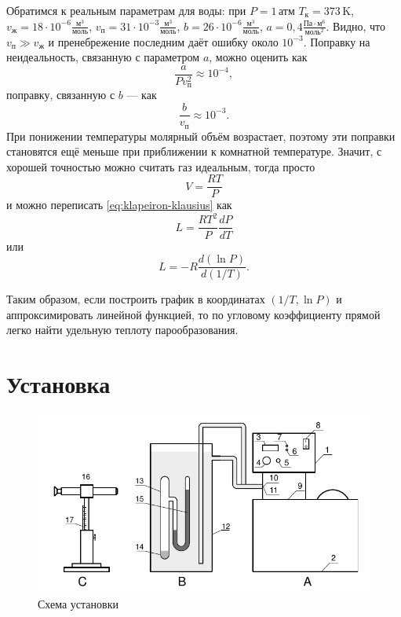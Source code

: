 \documentclass[12pt]{article}
\begin{document}
	Обратимся к реальным параметрам для воды: при $P = 1\, \text{атм}$ $T_\text{к}=373 \,\text{K}$, $v_\text{ж}=18\cdot 10^{-6} \frac{\text{м}^3}{\text{моль}}$, $v_\text{п}=31\cdot 10^{-3} \frac{\text{м}^3}{\text{моль}}$, $b=26\cdot 10^{-6} \frac{\text{м}^3}{\text{моль}}$, $a=0{,}4 \frac{\text{Па}\cdot \text{м}^6}{\text{моль}^2}$. Видно, что $v_\text{п} \gg v_\text{ж}$ и пренебрежение последним даёт ошибку около $10^{-3}$. Поправку на неидеальность, связанную с параметром $a$, можно оценить как
	$$
	\frac{a}{Pv^2_\text{п}} \approx 10^{-4},
	$$
	поправку, связанную с $b$ --- как
	$$
	\frac{b}{v_\text{п}} \approx 10^{-3}.
	$$
	При понижении температуры молярный объём возрастает, поэтому эти поправки становятся ещё меньше при приближении к комнатной температуре. Значит, с хорошей точностью можно считать газ идеальным, тогда просто
	$$ V=\frac{RT}{P} $$
	и можно переписать \eqref{eq:klapeiron-klausius} как
	\begin{equation}
		\label{eq:klapeiron-klausius_concrete}
		L=\frac{RT^2}{P} \frac{dP}{dT}
	\end{equation}
	или
	\begin{equation}
		\label{eq:klapeiron-klausius_final}
		L=-R \frac{d \left( \ln P \right)}{d \left( 1/T \right) }.
	\end{equation}
	
	Таким образом, если построить график в координатах $\left( 1/T, \ln P \right)$ и аппроксимировать линейной функцией, то по угловому коэффициенту прямой легко найти удельную теплоту парообразования.
	
	\section*{Установка}
	
	\begin{figure}[h!]
	\caption{Схема установки}
	\label{fig:scheme}
	\begin{center}
	\includegraphics[scale=0.6]{scheme.png}
	\end{center}
	\end{figure}
	
\end{document}
